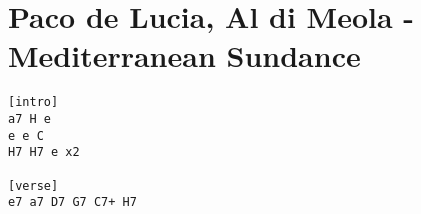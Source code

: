 \section{Paco de Lucia, Al di Meola - Mediterranean Sundance}
\begin{verbatim}
[intro]
a7 H e
e e C
H7 H7 e x2

[verse]
e7 a7 D7 G7 C7+ H7
\end{verbatim}
\newpage


